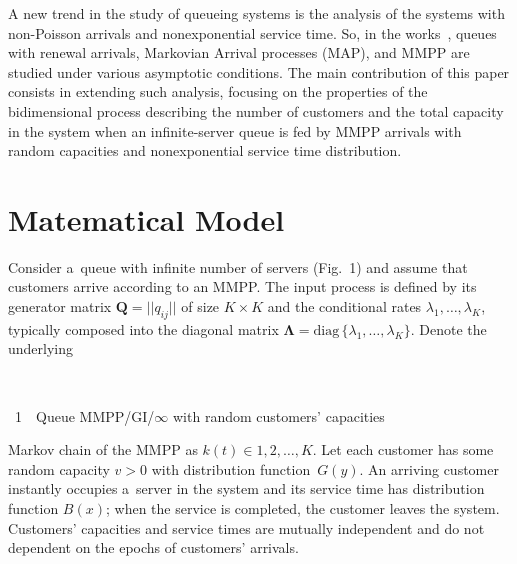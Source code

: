 \begin{multicols}{2}
A new trend in the study of queueing systems is the analysis of the systems with 
non-Poisson arrivals and nonexponential service time. So, in the 
works~\cite{lit1, lit2, lit4, lit5, lit11}, queues with renewal arrivals, 
Markovian Arrival processes (MAP), and MMPP 
are studied under various asymptotic conditions. 
The main contribution of this paper consists in extending such analysis, 
focusing on the properties of the bidimensional process describing the 
number of customers and the total capacity in the system when an infinite-server 
queue is fed by MMPP arrivals with random capacities and nonexponential service 
time distribution.


\section{Matematical Model}

\noindent
Consider a~queue with infinite number of servers (Fig.~1) 
and assume that customers arrive according to an MMPP. The input process is 
defined by its generator matrix $\mathbf{Q}=||q_{ij}||$ of size $K\times K$ and 
the conditional rates $\lambda_1,\ldots,\lambda_K$, typically composed into 
the diagonal matrix $\mathbf{\Lambda}=\mathrm{diag}\,\{\lambda_1,\ldots,\lambda_K\} $. 
Denote the underlying\linebreak\vspace*{-12pt}

 { \begin{center}  %
 \vspace*{-1pt}
 \mbox{%
 \epsfxsize=45.705mm 
 }


\end{center}


\noindent
{{\figurename~1}\ \ \small{Queue MMPP/GI/$\infty$ with random customers' capacities}}
}

\vspace*{9pt}

\addtocounter{figure}{1}



\noindent
 Markov chain of the MMPP as $k(t) \in 1,2,\ldots,K$. 
Let each customer has some random capacity $v>0$ with distribution function~$G(y)$. 
An arriving customer instantly occupies a~server in the system and its service 
time has distribution function $B(x)$; when the service is completed, the customer 
leaves the system. Customers' capacities and service times are mutually 
independent and do not dependent on the epochs of customers' arrivals.


\end{multicols}
